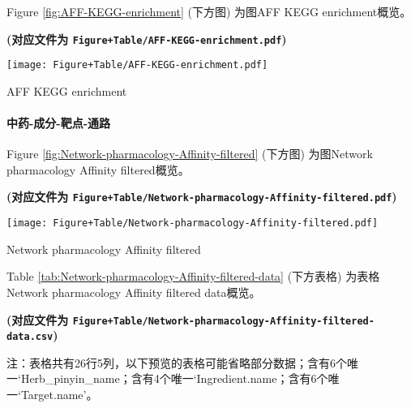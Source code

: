 \documentclass[
]{article}
\begin{document}
Figure \ref{fig:AFF-KEGG-enrichment} (下方图) 为图AFF KEGG enrichment概览。

\textbf{(对应文件为 \texttt{Figure+Table/AFF-KEGG-enrichment.pdf})}

\def\@captype{figure}
\begin{center}
\texttt{[image: Figure+Table/AFF-KEGG-enrichment.pdf]}
\caption{AFF KEGG enrichment}\label{fig:AFF-KEGG-enrichment}
\end{center}

\hypertarget{ux4e2dux836f-ux6210ux5206-ux9776ux70b9-ux901aux8def}{%
\paragraph{中药-成分-靶点-通路}\label{ux4e2dux836f-ux6210ux5206-ux9776ux70b9-ux901aux8def}}

Figure \ref{fig:Network-pharmacology-Affinity-filtered} (下方图) 为图Network pharmacology Affinity filtered概览。

\textbf{(对应文件为 \texttt{Figure+Table/Network-pharmacology-Affinity-filtered.pdf})}

\def\@captype{figure}
\begin{center}
\texttt{[image: Figure+Table/Network-pharmacology-Affinity-filtered.pdf]}
\caption{Network pharmacology Affinity filtered}\label{fig:Network-pharmacology-Affinity-filtered}
\end{center}

Table \ref{tab:Network-pharmacology-Affinity-filtered-data} (下方表格) 为表格Network pharmacology Affinity filtered data概览。

\textbf{(对应文件为 \texttt{Figure+Table/Network-pharmacology-Affinity-filtered-data.csv})}

\begin{center}\begin{tcolorbox}[colback=gray!10, colframe=gray!50, width=0.9\linewidth, arc=1mm, boxrule=0.5pt]注：表格共有26行5列，以下预览的表格可能省略部分数据；含有6个唯一`Herb\_pinyin\_name；含有4个唯一`Ingredient.name；含有6个唯一`Target.name'。
\end{tcolorbox}
\end{center}
\end{document}
